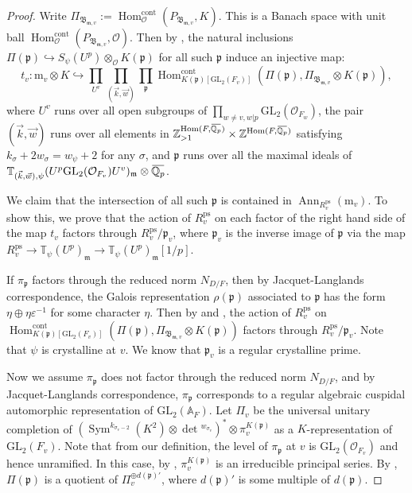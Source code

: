 \documentclass[a4paper, 12pt]{amsart}
\DeclareMathOperator{\Hom}{Hom}
\DeclareMathOperator{\Sym}{Sym}
\def\cont{\mathrm{cont}}
\def\ps{\mathrm{ps}}
\newcommand{\Z}{\mathbb{Z}}
\newcommand{\Q}{\mathbb{Q}}
\newcommand{\T}{\mathbb{T}}
\newcommand{\A}{\mathbb{A}}
\newcommand{\GL}{\mathrm{GL}}
\newcommand{\cO}{\mathcal{O}}
\newcommand{\kp}{\mathfrak{p}}
\newcommand{\kB}{\mathfrak{B}}
\newcommand{\km}{\mathfrak{m}}
\newcommand{\mm}{\mathrm{m}}
\newcommand{\overbar}[1]{\mkern 1.5mu\overline{\mkern-1.5mu#1\mkern-1.5mu}\mkern 1.5mu}
\begin{document}
\begin{proof}
    	Write $\Pi_{\kB_{\km,v}}:=\Hom^{\cont}_\cO(P_{\kB_{\km,v}},K)$. This is a Banach space with unit ball $\Hom^{\cont}_\cO(P_{\kB_{\km,v}},\cO)$. Then by \cite[Lemma 3.3.4]{Zhang:2024aa}, the natural inclusions $\Pi(\kp) \hookrightarrow S_{\psi}(U^p)\otimes_{\cO} K(\kp)$ for all such $\kp$ induce an injective map:
    	$$t_v: \mm_v \otimes K \hookrightarrow\prod_{U^v}\prod_{(\vec{k},\vec{w})}\prod_\kp \Hom^{\cont}_{K(\kp)[\GL_2(F_v)]}(\Pi(\kp),\Pi_{\kB_{\km,v}}\otimes K(\kp)),$$
    	where $U^v$ runs over all open subgroups of $\prod_{w\neq v,w|p} \GL_2(\cO_{F_w})$, the pair $(\vec{k},\vec{w})$ runs over all elements  in $\Z_{>1}^{\Hom(F,\overbar{\Q_p})}\times  \Z^{\Hom(F,\overbar{\Q_p})}$ satisfying $k_\sigma+2w_\sigma=w_\psi+2$  for any $\sigma$, and $\kp$ runs over all the maximal ideals of $\T_{(\vec{k},\vec{w}),\psi}(U^p\GL_2(\cO_{F_v})U^v)_\km\otimes \overbar{\Q_p}$. 
    	
    	We claim that the intersection of all such $\kp$ is contained in  $\operatorname{Ann}_{R_v^\ps}(\mm_v) $. To show this, we prove that the action of $ R_v^\ps$ on each factor of the right hand side of the map $t_v$ factors through $R_v^\ps/\kp_v$, where $\kp_v$ is the inverse image of $\kp$ via the map $R_v^\ps \to \T_{\psi}(U^p)_\km \to  \T_{\psi}(U^p)_\km[1/p]$. 
    	
    	If $\pi_\kp$ factors through the reduced norm $N_{D/F}$, then by Jacquet-Langlands correspondence, the Galois representation $\rho(\kp)$ associated to $\kp$ has the form $\eta \oplus \eta\varepsilon^{-1}$ for some character $\eta$. Then by \cite[Proposition 4.37]{Pa_k_nas_2013} and \cite[Corollary 6.10]{Pa_k_nas_2021}, the action of $R_v^\ps$ on $\Hom^{\cont}_{K(\kp)[\GL_2(F_v)]}(\Pi(\kp),\Pi_{\kB_{\km,v}}\otimes K(\kp)) $ factors through $R_v^\ps/\kp_v$. Note that $\psi$ is crystalline at $v$. We know that $\kp_v$ is a regular crystalline prime.
    	
    	Now we assume $\pi_\kp$ does not factor through the reduced norm $N_{D/F}$, and by Jacquet-Langlands correspondence, $\pi_\kp$ corresponds to a regular algebraic cuspidal automorphic representation of $\GL_2(\A_F)$. Let $\Pi_v$ be the universal unitary completion of $(\Sym^{k_{\sigma_v-2}}(K^2)\otimes \det{}^{w_{\sigma_v}})^*\otimes \pi^{K(\kp)}_v$ as a $K$-representation of $\GL_2(F_v)$. Note that from our definition, the level of $\pi_\kp$ at $v$ is $\GL_2(\cO_{F_v}) $ and hence unramified. In this case, by \cite[Fact 4.17]{Gee_2022}, $\pi^{K(\kp)}_v$ is an irreducible principal series. By \cite[Lemma 3.5.7]{pan2022fontaine}, $\Pi(\kp)$ is a quotient of $\Pi_v^{\oplus d(\kp)'}$, where $ d(\kp)'$ is some multiple of $d(\kp) $.
    	

\end{proof}
\end{document}
